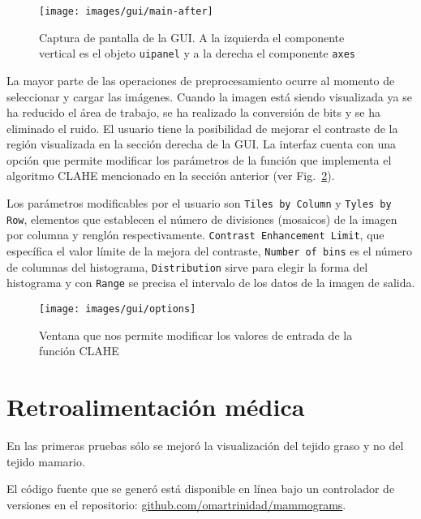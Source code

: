 \begin{figure}[h]
  \begin{center}
    {\texttt{[image: images/gui/main-after]}}
  \end{center}

  \caption[GUI: Ventana principal 2]{Captura de pantalla de la GUI. A la
  izquierda el componente vertical es el objeto \texttt{uipanel} y a la derecha
  el componente \texttt{axes}} 

  \label{main:after} 
\end{figure}

La mayor parte de las operaciones de preprocesamiento ocurre al momento de
seleccionar y cargar las imágenes. Cuando la imagen está siendo visualizada ya
se ha reducido el área de trabajo, se ha realizado la conversión de bits y se
ha eliminado el ruido. El usuario tiene la posibilidad de mejorar el contraste
de la región visualizada en la sección derecha de la GUI. La interfaz cuenta
con una opción que permite modificar los parámetros de la función que
implementa el algoritmo CLAHE mencionado en la sección anterior (ver
Fig.~\ref{options}). 

Los parámetros modificables por el usuario son \texttt{Tiles by Column} y
\texttt{Tyles by Row}, elementos que establecen el número de divisiones
(mosaicos) de la imagen por columna y renglón respectivamente. \texttt{Contrast
Enhancement Limit}, que específica el valor límite de la mejora del contraste,
\texttt{Number of bins} es el número de columnas del histograma,
\texttt{Distribution} sirve para elegir la forma del histograma y con
\texttt{Range} se precisa el intervalo de los datos de la imagen de salida.

\begin{figure}[h]
  \begin{center}
    {\texttt{[image: images/gui/options]}}
  \end{center}
  \caption[GUI: Modificación de parámetros]
  {Ventana que nos permite modificar los valores de entrada de la función CLAHE} 
  \label{options} 
\end{figure}

\section{Retroalimentación médica}

En las primeras pruebas sólo se mejoró  la visualización del tejido graso y no
del tejido mamario.


El código fuente que se generó está disponible en línea bajo un controlador de
versiones en el repositorio: \url{github.com/omartrinidad/mammograms}.

